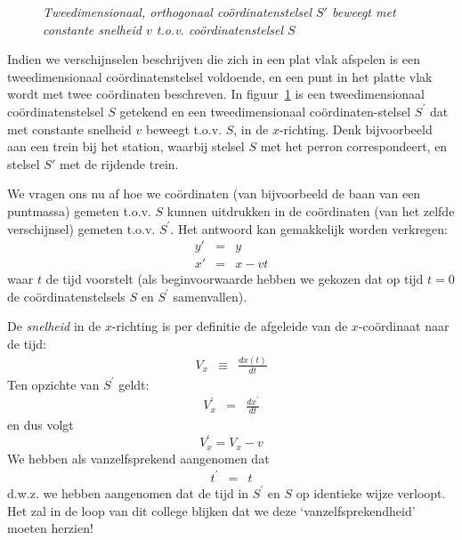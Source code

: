 \begin{figure}[ht]
\centering
{}
\caption{{\sl Tweedimensionaal, orthogonaal co\"{o}rdinatenstelsel $S'$ beweegt
met constante snelheid $v$ t.o.v. co\"{o}rdinatenstelsel $S$}}
\label{f:galilei2}
\end{figure}

Indien we verschijnselen beschrijven die zich in een plat vlak afspelen 
is een tweedimensionaal co\"{o}rdinatenstelsel voldoende, en een punt
in het platte vlak wordt met twee co\"ordinaten beschreven.
In figuur~\ref{f:galilei2} is een tweedimensionaal co\"{o}rdinatenstelsel $S$ 
getekend en een tweedimensionaal co\"{o}rdinaten-stelsel $S^{'}$ dat met 
constante snelheid $v$ beweegt t.o.v. $S$, in de $x$-richting. Denk
bijvoorbeeld aan een trein bij het station, waarbij stelsel $S$ met
het perron correspondeert, en stelsel $S'$ met de rijdende trein.

We vragen ons nu af hoe we co\"{o}rdinaten (van bijvoorbeeld de baan van 
een puntmassa) gemeten t.o.v. $S$ kunnen uitdrukken in de co\"{o}rdinaten 
(van het zelfde verschijnsel) gemeten t.o.v. $S^{'}$.
Het antwoord kan gemakkelijk worden verkregen:
\begin{eqnarray}
\label{v:galilei1a}
y' &=& y\\
\label{v:galilei1b}
x' &= & x - vt
\end{eqnarray}
waar $t$ de tijd voorstelt (als beginvoorwaarde hebben we gekozen dat op tijd $t=0$ de co\"{o}rdinatenstelsels $S$ en $S^{'}$ samenvallen).

De {\sl snelheid} in de $x$-richting is per definitie de afgeleide 
van de $x$-co\"{o}rdinaat naar de tijd:
\begin{eqnarray*}
V_{x} & \equiv & \frac{dx(t)}{dt}
\end{eqnarray*}
Ten opzichte van $S^{'}$ geldt:
\begin{eqnarray*}
V_{x}^{'} & = &  \frac{dx^{'}}{dt}
\end{eqnarray*}
en dus volgt
\begin{equation}
\label{v:galilei2}
V_{x}^{'} = V_{x} -v
\end{equation}
We hebben als vanzelfsprekend aangenomen dat
\begin{eqnarray*}
t^{'} & = &  t
\end{eqnarray*}
d.w.z. we hebben aangenomen dat de tijd in $S^{'}$ en $S$ op identieke wijze 
verloopt.
Het zal in de loop van dit college blijken dat we deze `vanzelfsprekendheid'
moeten herzien!

